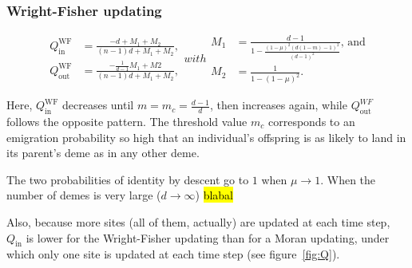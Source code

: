 \documentclass[11pt, letterpaper]{article}
\newcommand{\WF}{\textrm{WF}}
\newcommand{\Qin}{Q_{\textrm{in}}}
\newcommand{\Qout}{Q_{\textrm{out}}}
\begin{document}
\subsubsection{Wright-Fisher updating}

\begin{subequations}\label{eq:QWF}
\begin{align}
\Qin^{\WF} &= \frac{-d + M_1 + M_2}{(n-1) d +M_1 + M_2}, \\
\Qout^{\WF} & = \frac{-\frac{1}{d-1}M_1 + M2}{(n-1) d +M_1 + M_2},
\end{align}
with
\begin{align}
M_1 &= \frac{d-1}{1-\frac{(1-\mu )^2 (d (1-m)-1)^2}{(d-1)^2}} \textrm{, and}\\ 
M_2 &= \frac{1}{1-(1-\mu)^2}.
\end{align}
\end{subequations}

Here, $\Qin^{\WF}$ decreases until $m=m_c = \frac{d-1}{d}$, then increases again, while $\Qout^{WF}$ follows the opposite pattern. The threshold value $m_c$ corresponds to an emigration probability so high that an individual's offspring is as likely to land in its parent's deme as in any other deme.

The two probabilities of identity by descent go to $1$ when $\mu \to 1$. When the number of demes is very large ($d\to \infty$) \hl{blabal}

Also, because more sites (all of them, actually) are updated at each time step, $\Qin$ is lower for the Wright-Fisher updating than for a Moran updating, under which only one site is updated at each time step (see figure~\ref{fig:Q}). 
\end{document}
